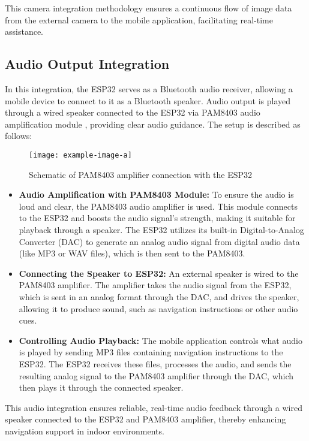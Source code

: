 This camera integration methodology ensures a continuous flow of image data from the external camera to the mobile application, facilitating real-time assistance.

\subsection{Audio Output Integration}

In this integration, the ESP32 serves as a Bluetooth audio receiver, allowing a mobile device to connect to it as a Bluetooth speaker. Audio output is played through a wired speaker connected to the ESP32 via PAM8403 audio amplification module , providing clear audio guidance. The setup is described as follows:

\begin{figure}[h!]
	\centering
	\texttt{[image: example-image-a]}
	\caption{Schematic of PAM8403 amplifier connection with the ESP32}
	\label{fig:speaker_schematics}
\end{figure}

\begin{itemize}
	\item \textbf{Audio Amplification with PAM8403 Module:} To ensure the audio is loud and clear, the PAM8403 audio amplifier is used. This module connects to the ESP32 and boosts the audio signal's strength, making it suitable for playback through a speaker. The ESP32 utilizes its built-in Digital-to-Analog Converter (DAC) to generate an analog audio signal from digital audio data (like MP3 or WAV files), which is then sent to the PAM8403.
	
	\item \textbf{Connecting the Speaker to ESP32:} An external speaker is wired to the PAM8403 amplifier. The amplifier takes the audio signal from the ESP32, which is sent in an analog format through the DAC, and drives the speaker, allowing it to produce sound, such as navigation instructions or other audio cues.
	
	\item \textbf{Controlling Audio Playback:} The mobile application controls what audio is played by sending MP3 files containing navigation instructions to the ESP32. The ESP32 receives these files, processes the audio, and sends the resulting analog signal to the PAM8403 amplifier through the DAC, which then plays it through the connected speaker.
\end{itemize}


This audio integration ensures reliable, real-time audio feedback through a wired speaker connected to the ESP32 and PAM8403 amplifier, thereby enhancing navigation support in indoor environments.


